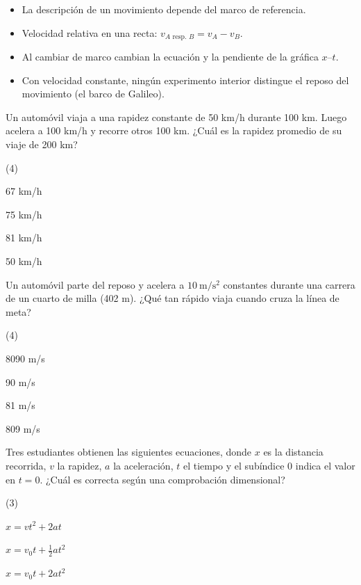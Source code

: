 \documentclass[11pt]{article}
\begin{document}
\begin{resumen}
\begin{itemize}
  \item La descripción de un movimiento depende del marco de referencia.
  \item Velocidad relativa en una recta: $v_{A\text{ resp. }B} = v_A - v_B$.
  \item Al cambiar de marco cambian la ecuación y la pendiente de la gráfica $x$--$t$.
  \item Con velocidad constante, ningún experimento interior distingue el reposo del
        movimiento (el barco de Galileo).
\end{itemize}
\end{resumen}


\begin{preguntas}
\pregunta Un automóvil viaja a una rapidez constante de 50 km/h durante 100 km. Luego acelera a
100 km/h y recorre otros 100 km. ¿Cuál es la rapidez promedio de su viaje de 200 km?
\begin{opciones*}(4)
  \item 67 km/h
  \item 75 km/h
  \item 81 km/h
  \item 50 km/h
\end{opciones*}

\pregunta Un automóvil parte del reposo y acelera a $10\ \mathrm{m/s^2}$ constantes durante una
carrera de un cuarto de milla (402 m). ¿Qué tan rápido viaja cuando cruza la línea de meta?
\begin{opciones*}(4)
  \item 8090 m/s
  \item 90 m/s
  \item 81 m/s
  \item 809 m/s
\end{opciones*}

\pregunta Tres estudiantes obtienen las siguientes ecuaciones, donde $x$ es la distancia
recorrida, $v$ la rapidez, $a$ la aceleración, $t$ el tiempo y el subíndice 0 indica el valor
en $t = 0$. ¿Cuál es correcta según una comprobación dimensional?
\begin{opciones*}(3)
  \item $x = vt^{2} + 2at$
  \item $x = v_{0}t + \frac{1}{2}at^{2}$
  \item $x = v_{0}t + 2at^{2}$
\end{opciones*}
\end{preguntas}
\end{document}
